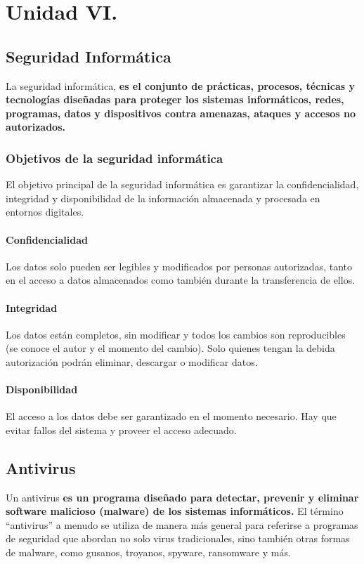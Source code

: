 \chapter{Unidad VI.}
\section{
	Seguridad Informática
}
La seguridad informática,\textbf{ es el conjunto de prácticas, procesos, técnicas y tecnologías diseñadas para proteger los sistemas informáticos, redes, programas, datos y dispositivos contra amenazas, ataques y accesos no autorizados.}
\subsection{Objetivos de la seguridad informática}
 El objetivo principal de la seguridad informática es garantizar la confidencialidad, integridad y disponibilidad de la información almacenada y procesada en entornos digitales.
 \subsubsection{Confidencialidad}
 Los  datos solo pueden ser legibles y modificados por personas autorizadas, tanto en el acceso a datos almacenados como también durante la transferencia de ellos.

\subsubsection{Integridad}
Los datos están completos, sin modificar y todos los cambios son reproducibles (se conoce el autor y el momento del cambio). Solo quienes tengan la debida autorización podrán eliminar, descargar o modificar datos.
\subsubsection{Disponibilidad}
El acceso a los datos debe ser garantizado en el momento necesario. Hay que evitar fallos del sistema y proveer el acceso adecuado.
\section{Antivirus}
 Un antivirus\textbf{ es un programa diseñado para detectar, prevenir y eliminar software malicioso (malware) de los sistemas informáticos.} El término ``antivirus'' a menudo se utiliza de manera más general para referirse a programas de seguridad que abordan no solo virus tradicionales, sino también otras formas de malware, como gusanos, troyanos, spyware, ransomware y más.
